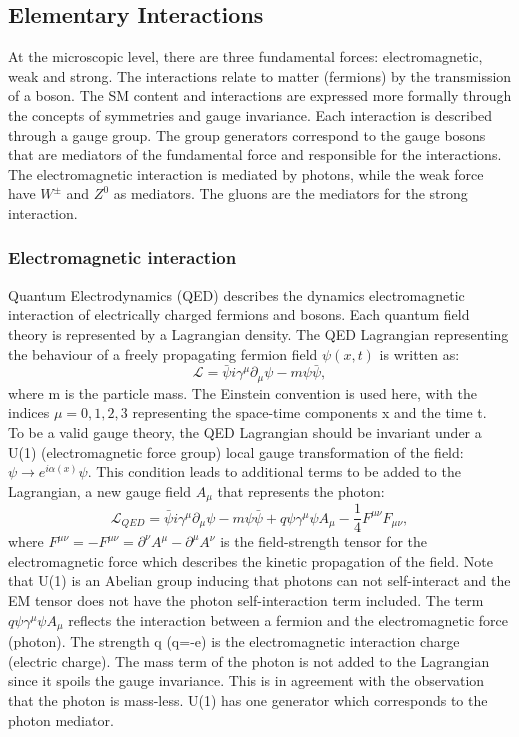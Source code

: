 \subsection{Elementary Interactions}
\label{chap1:SM:EI}
At the microscopic level, there are three fundamental forces: electromagnetic, weak and strong. The interactions relate to matter (fermions) by the transmission of a boson. The SM content and interactions are expressed more formally through the concepts of symmetries and gauge invariance. Each interaction is described through a gauge group. The group generators correspond to the gauge bosons that are mediators of the fundamental force and responsible for the interactions. The electromagnetic interaction is mediated by photons, while the weak force have $W^{\pm}$ and $Z^{0}$ as mediators. The gluons are the mediators for the strong interaction.

\subsubsection{Electromagnetic interaction}
Quantum Electrodynamics (QED) describes the dynamics electromagnetic interaction of electrically charged fermions and bosons. Each quantum field theory is represented by a Lagrangian density. The QED Lagrangian representing the behaviour of a freely propagating fermion field $\psi (x, t)$ is written as: 
\begin{equation}
    \mathcal{L} = \bar{\psi}i\gamma^\mu\partial_\mu\psi - m\psi\bar{\psi},
\end{equation}
where m is the particle mass. The Einstein convention is used here, with the indices $\mu= 0,1,2,3$ representing the space-time components x and the time t. \\ 
To be a valid gauge theory, the QED Lagrangian should be invariant under a U(1) (electromagnetic force group) local gauge transformation of the field: $\psi\rightarrow e^{i\alpha(x)}\psi$. This condition leads to additional terms to be added to the Lagrangian, a new gauge field $A_{\mu}$ that represents the photon:
\begin{equation}
    \mathcal{L}_{QED} = \bar{\psi}i\gamma^\mu\partial_\mu\psi - m\psi\bar{\psi} + q\psi\gamma^{\mu}\psi A_{\mu} - \frac{1}{4}F^{\mu\nu}F_{\mu\nu},
\end{equation}
where $F^{\mu\nu} = - F^{\mu\nu} = \partial^{\nu}A^{\mu} - \partial^{\mu}A^{\nu}$ is the field-strength tensor for the electromagnetic force which describes the kinetic propagation of the field. Note that U(1) is an Abelian group inducing that photons can not self-interact and the EM tensor does not have the photon self-interaction term included. The term $q\psi\gamma^{\mu}\psi A_{\mu}$ reflects the interaction between a fermion and the electromagnetic force (photon). The strength q (q=-e) is the electromagnetic interaction charge (electric charge). The mass term of the photon is not added to the Lagrangian since it spoils the gauge invariance. This is in agreement with the observation that the photon is mass-less. U(1) has one generator which corresponds to the photon mediator.

